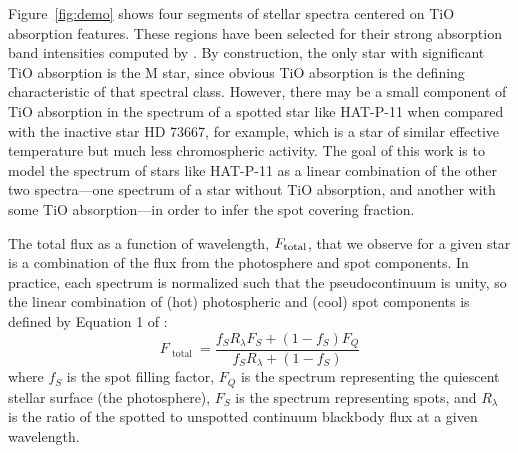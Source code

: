 
Figure~\ref{fig:demo} shows four segments of stellar spectra centered on TiO absorption features. These regions have been selected for their strong absorption band intensities computed by \citet{Valenti1998}. By construction, the only star with significant TiO absorption is the M star, since obvious TiO absorption is the defining characteristic of that spectral class. However, there may be a small component of TiO absorption in the spectrum of a spotted star like HAT-P-11 when compared with the inactive star HD 73667, for example, which is a star of similar effective temperature but much less chromospheric activity. The goal of this work is to model the spectrum of stars like HAT-P-11 as a linear combination of the other two spectra---one spectrum of a star without TiO absorption, and another with some TiO absorption---in order to infer the spot covering fraction.


The total flux as a function of wavelength, $F_{\rm total}$, that we observe for a given star is a combination of the flux from the photosphere and spot components. In practice, each spectrum is normalized such that the pseudocontinuum is unity, so the linear combination of (hot) photospheric and (cool) spot components is defined by Equation 1 of \citet{Neff1995}:
\begin{equation}
F _ { \text { total } } = \frac { f _ { S } R _ { \lambda } F _ { S } + \left( 1 - f _ { S } \right) F _ { Q } } { f _ { S } R _ { \lambda } + \left( 1 - f _ { S } \right) } \label{eqn:main}
\end{equation}
where $f_S$ is the spot filling factor, $F_Q$ is the spectrum representing the quiescent stellar surface (the photosphere), $F_S$ is the spectrum representing spots, and $R_\lambda$ is the ratio of the spotted to unspotted continuum blackbody flux at a given wavelength. 



